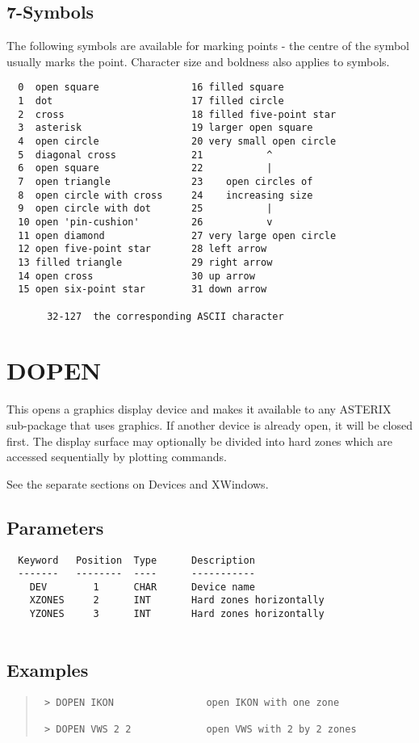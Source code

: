 \documentclass{book}
\renewcommand{\_}{{\tt\char'137}}     %
\begin{document}
\subsection{7-Symbols}
The following symbols are available for marking points -
the centre of the symbol usually marks the point.
Character size and boldness also applies to symbols.
\begin{verbatim}
  0  open square                16 filled square
  1  dot                        17 filled circle
  2  cross                      18 filled five-point star
  3  asterisk                   19 larger open square
  4  open circle                20 very small open circle
  5  diagonal cross             21           ^
  6  open square                22           |
  7  open triangle              23    open circles of
  8  open circle with cross     24    increasing size
  9  open circle with dot       25           |
  10 open 'pin-cushion'         26           v
  11 open diamond               27 very large open circle
  12 open five-point star       28 left arrow
  13 filled triangle            29 right arrow
  14 open cross                 30 up arrow
  15 open six-point star        31 down arrow
 
       32-127  the corresponding ASCII character
 \end{verbatim}
\section{DOPEN}
This opens a graphics display device and makes it available to
any ASTERIX sub-package that uses graphics. If another device
is already open, it will be closed first. The display surface
may optionally be divided into hard zones which are accessed
sequentially by plotting commands.
 
See the separate sections on Devices and XWindows.
 
\subsection{Parameters}
\begin{verbatim}
  Keyword   Position  Type      Description
  -------   --------  ----      -----------
    DEV        1      CHAR      Device name
    XZONES     2      INT       Hard zones horizontally
    YZONES     3      INT       Hard zones horizontally
 
\end{verbatim}\subsection{Examples}
\begin{quote}\begin{verbatim}
 > DOPEN IKON                open IKON with one zone
 
 > DOPEN VWS 2 2             open VWS with 2 by 2 zones
\end{verbatim}\end{quote}
\end{document}

